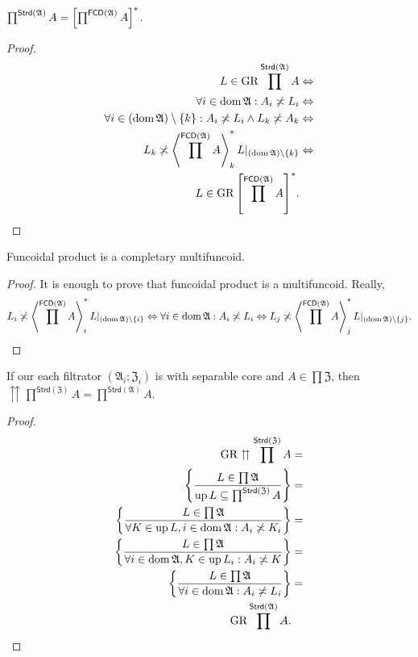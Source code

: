 \begin{prop}
$\prod^{\mathsf{Strd}(\mathfrak{A})}A=\mathord{\mathrel{\left[\prod^{\mathsf{FCD}(\mathfrak{A})}A\right]^{\ast}}}$.\end{prop}
\begin{proof}
~
\begin{align*}
L\in\operatorname{GR}\prod^{\mathsf{Strd}(\mathfrak{A})}A & \Leftrightarrow\\
\forall i\in\operatorname{dom}\mathfrak{A}:A_{i}\not\asymp L_{i} & \Leftrightarrow\\
\forall i\in(\operatorname{dom}\mathfrak{A})\setminus\{k\}:A_{i}\not\asymp L_{i}\land L_{k}\not\asymp A_{k} & \Leftrightarrow\\
L_{k}\not\asymp\left\langle \prod^{\mathsf{FCD}(\mathfrak{A})}A\right\rangle ^{\ast}_{k}L|_{(\operatorname{dom}\mathfrak{A})\setminus\{k\}} & \Leftrightarrow\\
L\in\operatorname{GR}\mathord{\mathrel{\left[\prod^{\mathsf{FCD}(\mathfrak{A})}A\right]^{\ast}}}.
\end{align*}
\end{proof}
\begin{cor}
Funcoidal product is a completary multifuncoid.\end{cor}
\begin{proof}
It is enough to prove that funcoidal product is a multifuncoid. Really,
\[
L_{i}\not\asymp\left\langle \prod^{\mathsf{FCD}(\mathfrak{A})}A\right\rangle ^{\ast}_{i}L|_{(\operatorname{dom}\mathfrak{A})\setminus\{i\}}\Leftrightarrow\forall i\in\operatorname{dom}\mathfrak{A}:A_{i}\not\asymp L_{i}\Leftrightarrow L_{j}\not\asymp\left\langle \prod^{\mathsf{FCD}(\mathfrak{A})}A\right\rangle ^{\ast}_{j}L|_{(\operatorname{dom}\mathfrak{A})\setminus\{j\}}.
\]
\end{proof}
\begin{thm}
If our each filtrator $(\mathfrak{A}_i;\mathfrak{Z}_i)$
is with separable core and $A\in\prod\mathfrak{Z}$, then $\upuparrows\prod^{\mathsf{Strd}(\mathfrak{Z})}A=\prod^{\mathsf{Strd}(\mathfrak{A})}A$.\end{thm}
\begin{proof}
~
\begin{align*}
\operatorname{GR}\upuparrows\prod^{\mathsf{Strd}(\mathfrak{Z})}A & =\\
\left\{ \frac{L\in\prod\mathfrak{A}}{\operatorname{up} L\subseteq\prod^{\mathsf{Strd}(\mathfrak{Z})}A}\right\} & =\\
\left\{ \frac{L\in\prod\mathfrak{A}}{\forall K\in\operatorname{up} L,i\in\operatorname{dom}\mathfrak{A}:A_{i}\not\asymp K_{i}}\right\} & =\\
\left\{ \frac{L\in\prod\mathfrak{A}}{\forall i\in\operatorname{dom}\mathfrak{A},K\in\operatorname{up} L_{i}:A_{i}\not\asymp K}\right\} & =\\
\left\{ \frac{L\in\prod\mathfrak{A}}{\forall i\in\operatorname{dom}\mathfrak{A}:A_{i}\not\asymp L_{i}}\right\} & =\\
\operatorname{GR}\prod^{\mathsf{Strd}(\mathfrak{A})}A.
\end{align*}
\end{proof}

